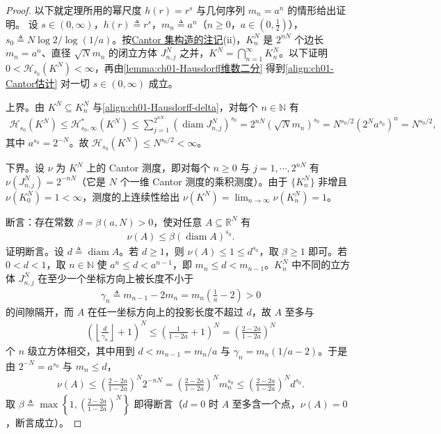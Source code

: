 \documentclass[../../main.tex]{subfiles}%
\begin{document}
\begin{proof}
以下就定理所用的幂尺度 $h(r)=r^s$ 与几何序列 $m_n=a^n$ 的情形给出证明。
设 $s\in(0,\infty)$，$h(r)\triangleq r^s$，$m_n\triangleq a^n$（$n\geqslant0$，$a\in(0,\frac12)$），$s_0\triangleq N\log2/\log(1/a)$。按\hyperref[remark:ch01-Cantor-Vitali]{Cantor 集构造的注记}(ii)，$K_n^N$ 是 $2^{nN}$ 个边长 $m_n=a^n$、直径 $\sqrt Nm_n$ 的闭立方体 $J_{n,j}^N$ 之并，$K^N=\bigcap_{n=1}^\infty K_n^N$。以下证明 $0<\mathcal{H}_{s_0}(K^N)<\infty$，再由\cref{lemma:ch01-Hausdorff维数二分} 得到\eqref{align:ch01-Cantor估计} 对一切 $s\in(0,\infty)$ 成立。

上界。由 $K^N\subseteq K_n^N$ 与\eqref{align:ch01-Hausdorff-delta}，对每个 $n\in\mathbb{N}$ 有
\begin{align*}
\mathcal{H}_{s_0}(K^N)\leqslant\mathcal{H}^*_{s_0,\infty}(K^N)\leqslant\sum_{j=1}^{2^{nN}}\left(\operatorname{diam}J_{n,j}^N\right)^{s_0}=2^{nN}(\sqrt Nm_n)^{s_0}=N^{s_0/2}\left(2^Na^{s_0}\right)^n=N^{s_0/2},
\end{align*}
其中 $a^{s_0}=2^{-N}$。故 $\mathcal{H}_{s_0}(K^N)\leqslant N^{s_0/2}<\infty$。

下界。设 $\nu$ 为 $K^N$ 上的 Cantor 测度，即对每个 $n\geqslant0$ 与 $j=1,\cdots,2^{nN}$ 有 $\nu(J_{n,j}^N)=2^{-nN}$（它是 $N$ 个一维 Cantor 测度的乘积测度）。由于 $\{K_n^N\}$ 非增且 $\nu(K_0^N)=1<\infty$，测度的上连续性给出 $\nu(K^N)=\lim_{n\to\infty}\nu(K_n^N)=1$。

断言：存在常数 $\beta=\beta(a,N)>0$，使对任意 $A\subseteq\mathbb{R}^N$ 有
\begin{align*}
\nu(A)\leqslant\beta\left(\operatorname{diam}A\right)^{s_0}.
\end{align*}
证明断言。设 $d\triangleq\operatorname{diam}A$。若 $d\geqslant1$，则 $\nu(A)\leqslant1\leqslant d^{s_0}$，取 $\beta\geqslant1$ 即可。若 $0<d<1$，取 $n\in\mathbb{N}$ 使 $a^n\leqslant d<a^{n-1}$，即 $m_n\leqslant d<m_{n-1}$。$K_n^N$ 中不同的立方体 $J_{n,j}^N$ 在至少一个坐标方向上被长度不小于
\begin{align*}
\gamma_n\triangleq m_{n-1}-2m_n=m_n\left(\frac{1}{a}-2\right)>0
\end{align*}
的间隙隔开，而 $A$ 在任一坐标方向上的投影长度不超过 $d$，故 $A$ 至多与
\begin{align*}
\left(\left\lfloor\frac{d}{\gamma_n}\right\rfloor+1\right)^N\leqslant\left(\frac{1}{1-2a}+1\right)^N=\left(\frac{2-2a}{1-2a}\right)^N
\end{align*}
个 $n$ 级立方体相交，其中用到 $d<m_{n-1}=m_n/a$ 与 $\gamma_n=m_n(1/a-2)$。于是由 $2^{-N}=a^{s_0}$ 与 $m_n\leqslant d$，
\begin{align*}
\nu(A)\leqslant\left(\frac{2-2a}{1-2a}\right)^N2^{-nN}=\left(\frac{2-2a}{1-2a}\right)^Nm_n^{s_0}\leqslant\left(\frac{2-2a}{1-2a}\right)^Nd^{s_0}.
\end{align*}
取 $\beta\triangleq\max\left\{1,\left(\frac{2-2a}{1-2a}\right)^N\right\}$ 即得断言（$d=0$ 时 $A$ 至多含一个点，$\nu(A)=0$，断言成立）。


\end{proof}
\end{document}

